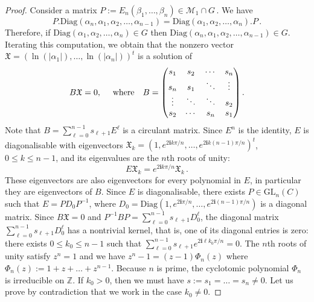 \documentclass[a4paper,11pt]{amsart}
\renewcommand{\leq}{\leqslant}
\newcommand{\GL}{\operatorname{GL}}
\def\GL{\mathrm{GL}}
\begin{document}
\begin{proof}
Consider a matrix $P:=E_n\left(\beta_1,\ldots, \beta_n\right)\in \mathcal{M}_1\cap G\, .$
We have 
$$P .\text{Diag}\left(\alpha_n,\alpha_1,\alpha_{2},\ldots, \alpha_{n-1} \right) = \text{Diag}\left(\alpha_1,\alpha_{2},\ldots, \alpha_{n} \right).P\, .$$
Therefore, if $\text{Diag}\left(\alpha_1,\alpha_{2},\ldots, \alpha_{n} \right)\in G$ then $\text{Diag}\left(\alpha_n,\alpha_1,\alpha_{2},\ldots, \alpha_{n-1} \right)\in G$.
Iterating this computation,  we obtain that the nonzero vector $\mathfrak{X}=( \ln(|\alpha_{1}|),\dots,  \ln(|\alpha_{n}|))^t$ is a solution of 
$$B\mathfrak{X}=0, \quad  \hbox{ where} \quad B=\begin{pmatrix}
s_1&s_2 &\cdots &s_n\\ 
s_n &s_1  &\ddots &\vdots \\
\vdots &\ddots & \ddots & s_2\\
s_{2}&\cdots & s_n &s_{1}
\end{pmatrix}.$$
Note that $B= \sum_{\ell=0}^{n-1} s_{\ell+1} E^{\ell}$ is a circulant matrix.  Since   $E^n$ is the identity, $E$ is diagonalisable with eigenvectors $\mathfrak{X}_k=(1, e^{2\mathbf{i}k\pi/n}, \dots, e^{2\mathbf{i}k(n-1)\pi/n} )^t$, $0\leq k\leq n-1$, and its eigenvalues are the $n$th roots of unity:
$$
E\mathfrak{X}_k = e^{2\mathbf{i}k\pi/n}\mathfrak{X}_k\, .
$$
These eigenvectors are also eigenvectors for every polynomial in $E$,  in particular they are eigenvectors of $B$.
Since $E$ is diagonalisable, there exists $P\in\GL_n(C)$  such that $E=PD_0 P^{-1}$, where $D_0 =\mathrm{Diag}(1,e^{2\mathbf{i}\pi/n},\dots,e^{2\mathbf{i}(n-1)\pi/n})$ is a diagonal matrix. 
Since $B\mathfrak{X}=0$ and $P^{-1}BP=\sum_{\ell=0}^{n-1} s_{\ell+1} D_0^{\ell}$, the diagonal matrix $\sum_{\ell=0}^{n-1} s_{\ell+1} D_0^{\ell}$ has a nontrivial kernel, that is, one of its diagonal entries is zero: there exists $0\leq k_0 \leq n-1$ such that  $\sum_{\ell=0}^{n-1} s_{\ell+1} e^{2\mathbf{i}\ell k_0\pi/n}=0$. 
The $n$th roots of unity satisfy $z^n=1$ and we have $z^n -1=(z-1)\Phi_n(z)$ where $\Phi_n(z):=1+z+\dots +z^{n-1}$.  Because $n$ is prime, the cyclotomic polynomial $\Phi_n$ is irreducible on $\mathbb{Z}$.   If $k_0>0$, then we must have $s:=s_1=\dots=s_n\neq 0$. Let us prove by contradiction that we work in the case $k_0\neq 0$.  


\end{proof}
\end{document}
